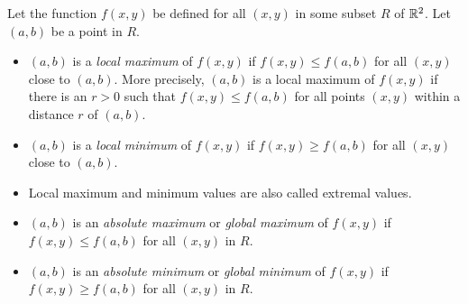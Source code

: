 \begin{defn}\label{def local max min}
Let the function $f(x,y)$ be defined for all $(x,y)$ in some
subset $R$ of $\mathbb{R}^2$. Let $(a,b)$ be a point in $R$.
\begin{itemize}
\item
$(a,b)$ is a \emph{local maximum} of $f(x,y)$ if
$f(x,y)\le f(a,b)$ for all $(x,y)$ close to $(a,b)$.
More precisely, $(a,b)$ is a local maximum of $f(x,y)$ if there is 
an $r>0$ such that $f(x,y)\le f(a,b)$ for 
all points $(x,y)$ within a distance $r$ of $(a,b)$. 

\item
$(a,b)$ is a \emph{local minimum} of $f(x,y)$ if
$f(x,y)\ge f(a,b)$ for all $(x,y)$ close to $(a,b)$.

\item 
Local maximum and minimum values are also called extremal values.

\item
$(a,b)$ is an \emph{absolute maximum} or
\emph{global maximum} of $f(x,y)$ if
$f(x,y)\le f(a,b)$ for all $(x,y)$ in $R$.

\item
$(a,b)$ is an \emph{absolute minimum} or
\emph{global minimum} of $f(x,y)$ if
$f(x,y)\ge f(a,b)$ for all $(x,y)$ in $R$.
\end{itemize}
\end{defn}


